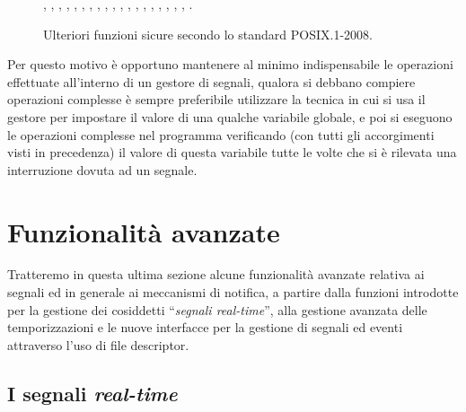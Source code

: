 \begin{figure}[!htb]
  \footnotesize \centering
  \begin{minipage}[c]{14cm}
     , , , ,
     , , , ,
     , , , ,
     , , , ,
     , , , .
  \end{minipage} 
  \normalsize 
  \caption{Ulteriori funzioni sicure secondo lo standard POSIX.1-2008.}
  \label{fig:sig_safe_functions_posix_2008}
\end{figure}


Per questo motivo è opportuno mantenere al minimo indispensabile le operazioni
effettuate all'interno di un gestore di segnali, qualora si debbano compiere
operazioni complesse è sempre preferibile utilizzare la tecnica in cui si usa
il gestore per impostare il valore di una qualche variabile globale, e poi si
eseguono le operazioni complesse nel programma verificando (con tutti gli
accorgimenti visti in precedenza) il valore di questa variabile tutte le volte
che si è rilevata una interruzione dovuta ad un segnale.


\section{Funzionalità avanzate}
\label{sec:sig_advanced_signal}

Tratteremo in questa ultima sezione alcune funzionalità avanzate relativa ai
segnali ed in generale ai meccanismi di notifica, a partire dalla funzioni
introdotte per la gestione dei cosiddetti ``\textsl{segnali real-time}'', alla
gestione avanzata delle temporizzazioni e le nuove interfacce per la gestione
di segnali ed eventi attraverso l'uso di file descriptor.

\subsection{I segnali \textit{real-time}}
\label{sec:sig_real_time}

